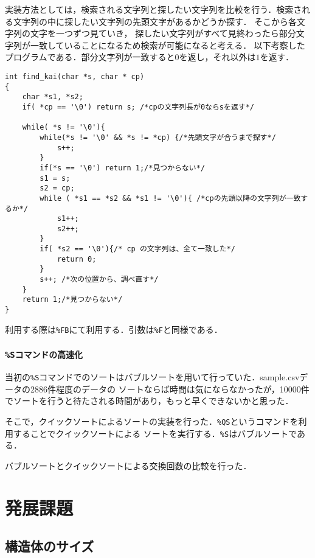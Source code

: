 \documentclass[a4j,11pt]{jarticle}
\begin{document}
実装方法としては，検索される文字列と探したい文字列を比較を行う．検索される文字列の中に探したい文字列の先頭文字があるかどうか探す．
そこから各文字列の文字を一つずつ見ていき，
探したい文字列がすべて見終わったら部分文字列が一致していることになるため検索が可能になると考える．
以下考察したプログラムである．部分文字列が一致すると$0$を返し，それ以外は$1$を返す．
\begin{verbatim}
int find_kai(char *s, char * cp)
{
	char *s1, *s2;
	if( *cp == '\0') return s; /*cpの文字列長が0ならsを返す*/ 

	while( *s != '\0'){
		while(*s != '\0' && *s != *cp) {/*先頭文字が合うまで探す*/
			s++;
		}
		if(*s == '\0') return 1;/*見つからない*/
		s1 = s;
		s2 = cp;
		while ( *s1 == *s2 && *s1 != '\0'){ /*cpの先頭以降の文字列が一致するか*/
			s1++;
			s2++;
		}
		if( *s2 == '\0'){/* cp の文字列は、全て一致した*/
			return 0;
		}
		s++; /*次の位置から、調べ直す*/
	}
	return 1;/*見つからない*/
}
\end{verbatim}
利用する際は\verb|%FB|にて利用する．引数は\verb|%F|と同様である．
\subsubsection{\texttt{\%Sコマンドの高速化}}
当初の\verb|%S|コマンドでのソートはバブルソートを用いて行っていた．sample.csvデータの2886件程度のデータの
ソートならば時間は気にならなかったが，10000件でソートを行うと待たされる時間があり，もっと早くできないかと思った．

そこで，クイックソートによるソートの実装を行った．\verb|%QS|というコマンドを利用することでクイックソートによる
ソートを実行する．\verb|%S|はバブルソートである．

バブルソートとクイックソートによる交換回数の比較を行った．


\section{発展課題}\label{sec:hatten}
\subsection{構造体のサイズ}
\end{document}
